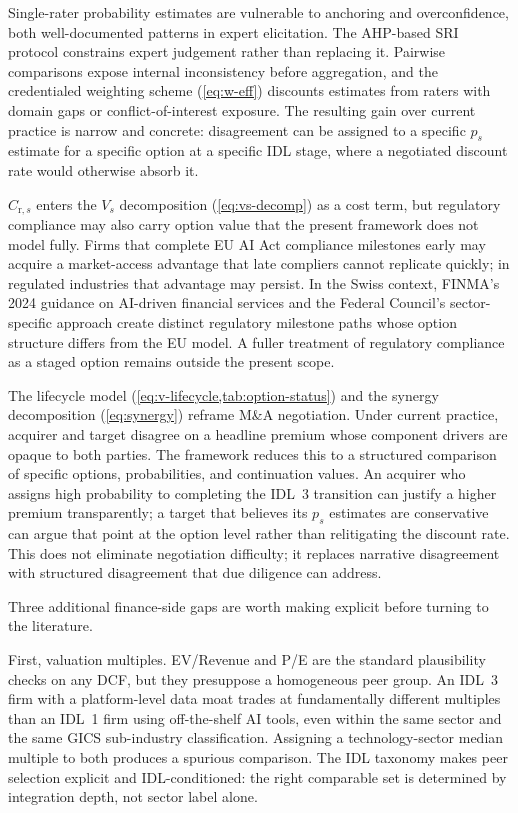 \documentclass[oneside,10pt]{swissi}
\begin{document}
Single-rater probability estimates are vulnerable to anchoring and overconfidence, both well-documented patterns in expert elicitation. The AHP-based SRI protocol constrains expert judgement rather than replacing it. Pairwise comparisons expose internal inconsistency before aggregation, and the credentialed weighting scheme (\cref{eq:w-eff}) discounts estimates from raters with domain gaps or conflict-of-interest exposure. The resulting gain over current practice is narrow and concrete: disagreement can be assigned to a specific $p_s$ estimate for a specific option at a specific IDL stage, where a negotiated discount rate would otherwise absorb it.

$C_{\mathrm{r},s}$ enters the $V_s$ decomposition (\cref{eq:vs-decomp}) as a cost term, but regulatory compliance may also carry option value that the present framework does not model fully. Firms that complete EU AI Act compliance milestones early may acquire a market-access advantage that late compliers cannot replicate quickly; in regulated industries that advantage may persist. In the Swiss context, FINMA's 2024 guidance on AI-driven financial services \autocite{finma2024guidance08} and the Federal Council's sector-specific approach \autocite{bakom2025aiapproach} create distinct regulatory milestone paths whose option structure differs from the EU model. A fuller treatment of regulatory compliance as a staged option remains outside the present scope.

The lifecycle model (\cref{eq:v-lifecycle,tab:option-status}) and the synergy decomposition (\cref{eq:synergy}) reframe M\&A negotiation. Under current practice, acquirer and target disagree on a headline premium whose component drivers are opaque to both parties. The framework reduces this to a structured comparison of specific options, probabilities, and continuation values. An acquirer who assigns high probability to completing the IDL~3 transition can justify a higher premium transparently; a target that believes its $p_s$ estimates are conservative can argue that point at the option level rather than relitigating the discount rate. This does not eliminate negotiation difficulty; it replaces narrative disagreement with structured disagreement that due diligence can address.

Three additional finance-side gaps are worth making explicit before turning to the literature.

First, valuation multiples. EV/Revenue and P/E are the standard plausibility checks on any DCF, but they presuppose a homogeneous peer group. An IDL~3 firm with a platform-level data moat trades at fundamentally different multiples than an IDL~1 firm using off-the-shelf AI tools, even within the same sector and the same GICS sub-industry classification. Assigning a technology-sector median multiple to both produces a spurious comparison. The IDL taxonomy makes peer selection explicit and IDL-conditioned: the right comparable set is determined by integration depth, not sector label alone.
\end{document}
